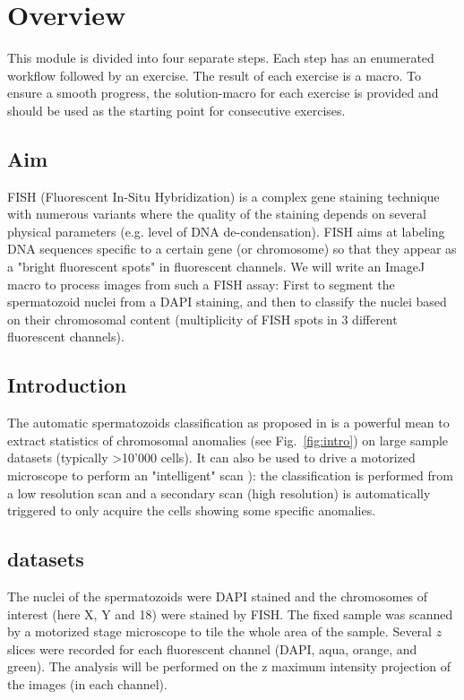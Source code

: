 \section{Overview}

This module is divided into four separate steps. Each step has an enumerated workflow followed by an exercise. The result of each exercise is a macro. To ensure a smooth progress, the solution-macro for each exercise is provided and should be used as the starting point for consecutive exercises.

\subsection{Aim}

FISH (Fluorescent In-Situ Hybridization) is a complex gene staining technique with numerous variants \cite{volpi2008fish} where the quality of the staining depends on several physical parameters (e.g. level of DNA de-condensation). FISH aims at labeling DNA sequences specific to a certain gene (or chromosome) so that they appear as a "bright fluorescent spots" in fluorescent channels. We will write an ImageJ macro to process images from such a FISH assay: First to segment the spermatozoid nuclei from a DAPI staining, and then to classify the nuclei based on their chromosomal content (multiplicity of FISH spots in 3 different fluorescent channels).

\subsection{Introduction}

The automatic spermatozoids classification as proposed in \cite{molina2009fish} is a powerful mean to extract statistics of chromosomal anomalies (see Fig.~\ref{fig:intro}) on large sample datasets (typically >10'000 cells). It can also be used to drive a motorized microscope to perform an "intelligent" scan \cite{tosi2012}): the classification is performed from a low resolution scan and a secondary scan (high resolution) is automatically triggered to only acquire the cells showing some specific anomalies.

\subsection{datasets}
The nuclei of the spermatozoids were DAPI stained and the chromosomes of interest (here X, Y and 18) were  stained by FISH. The fixed sample was scanned by a motorized stage microscope to tile the whole area of the sample. Several $z$ slices were recorded for each fluorescent channel (DAPI, aqua, orange, and green). The analysis will be performed on the z maximum intensity projection of the images (in each channel).